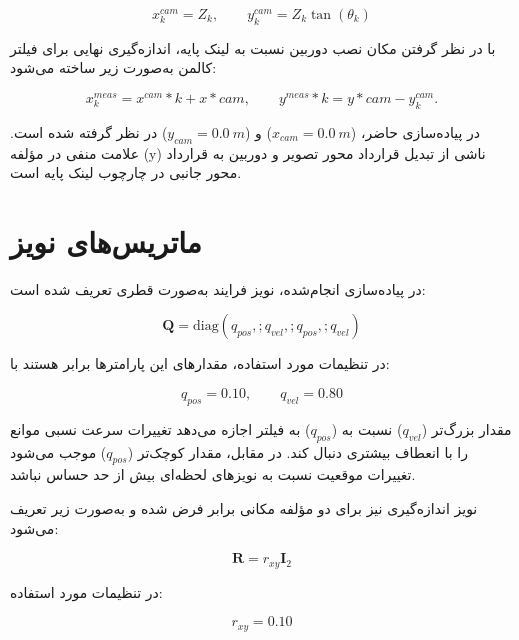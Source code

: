 \begin{equation}
	x^{cam}_k = Z_k,
	\qquad
	y^{cam}_k = Z_k \tan(\theta_k)
	\label{eq:app_camera_coordinates}
\end{equation}

با در نظر گرفتن مکان نصب دوربین نسبت به لینک پایه، اندازه‌گیری نهایی برای فیلتر کالمن به‌صورت زیر ساخته می‌شود:

\begin{equation}
	x^{meas}_k = x^{cam}*k + x*{cam},
	\qquad
	y^{meas}*k = y*{cam} - y^{cam}_k.
	\label{eq:app_base_measurement}
\end{equation}

در پیاده‌سازی حاضر، ($x_{cam}=0.0~m$) و ($y_{cam}=0.0~m$) در نظر گرفته شده است. علامت منفی در مؤلفه (y) ناشی از تبدیل قرارداد محور تصویر و دوربین به قرارداد محور جانبی در چارچوب لینک پایه است.

\section{ماتریس‌های نویز}

در پیاده‌سازی انجام‌شده، نویز فرایند به‌صورت قطری تعریف شده است:

\begin{equation}
	\mathbf{Q} =
	\mathrm{diag}
	\left(
	q_{pos},;
	q_{vel},;
	q_{pos},;
	q_{vel}
	\right)
	\label{eq:app_kalman_Q}
\end{equation}

در تنظیمات مورد استفاده، مقدارهای این پارامترها برابر هستند با:

\begin{equation}
	q_{pos}=0.10,
	\qquad
	q_{vel}=0.80
	\label{eq:app_kalman_Q_values}
\end{equation}

مقدار بزرگ‌تر ($q_{vel}$) نسبت به ($q_{pos}$) به فیلتر اجازه می‌دهد تغییرات سرعت نسبی موانع را با انعطاف بیشتری دنبال کند. در مقابل، مقدار کوچک‌تر ($q_{pos}$) موجب می‌شود تغییرات موقعیت نسبت به نویزهای لحظه‌ای بیش از حد حساس نباشد.

نویز اندازه‌گیری نیز برای دو مؤلفه مکانی برابر فرض شده و به‌صورت زیر تعریف می‌شود:

\begin{equation}
	\mathbf{R} =
	r_{xy}\mathbf{I}_2
	\label{eq:app_kalman_R}
\end{equation}

در تنظیمات مورد استفاده:

\begin{equation}
	r_{xy}=0.10
	\label{eq:app_kalman_R_value}
\end{equation}

